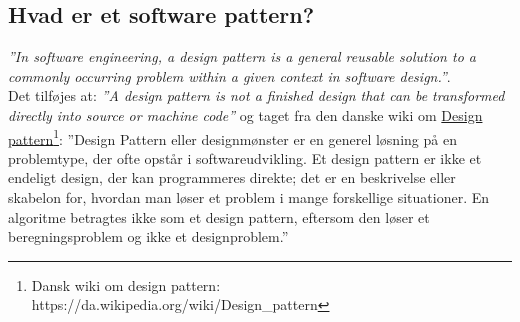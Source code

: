 \subsection{Hvad er et software pattern?}
\textit{''In software engineering, a design pattern is a general reusable solution to a commonly occurring problem within a given context in software design.''}.\\

Det tilføjes at: 
\textit{''A design pattern is not a finished design that can be transformed directly into source or machine code''} og taget fra den danske wiki om \href{https://da.wikipedia.org/wiki/Design_pattern}{Design pattern\footnote{Dansk wiki om design pattern:  \url{https://da.wikipedia.org/wiki/Design_pattern}}}:
''Design Pattern eller designmønster er en generel løsning på en problemtype, der ofte opstår i softwareudvikling. Et design pattern er ikke et endeligt design, der kan programmeres direkte; det er en beskrivelse eller skabelon for, hvordan man løser et problem i mange forskellige situationer. En algoritme betragtes ikke som et design pattern, eftersom den løser et beregningsproblem og ikke et designproblem.''